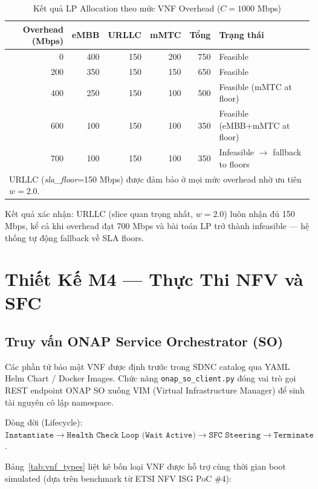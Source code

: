 \documentclass[12pt,a4paper]{article}
\begin{document}
\begin{table}[H]
\centering
\caption{Kết quả LP Allocation theo mức VNF Overhead ($C=1000$ Mbps)}
\label{tab:lp_overhead}
\begin{tabular}{rrrrrl}
\toprule
\textbf{Overhead (Mbps)} & \textbf{eMBB} & \textbf{URLLC} & \textbf{mMTC} & \textbf{Tổng} & \textbf{Trạng thái} \\
\midrule
0   & 400 & 150 & 200 & 750  & Feasible \\
200 & 350 & 150 & 150 & 650  & Feasible \\
400 & 250 & 150 & 100 & 500  & Feasible (mMTC at floor) \\
600 & 100 & 150 & 100 & 350  & Feasible (eMBB+mMTC at floor) \\
700 & 100 & 150 & 100 & 350  & Infeasible $\rightarrow$ fallback to floors \\
\bottomrule
\multicolumn{6}{l}{\footnotesize URLLC (\textit{sla\_floor}=150 Mbps) được đảm bảo ở mọi mức overhead nhờ ưu tiên $w=2.0$.}
\end{tabular}
\end{table}

Kết quả xác nhận: URLLC (slice quan trọng nhất, $w=2.0$) luôn nhận đủ 150 Mbps, kể cả khi overhead đạt 700 Mbps và bài toán LP trở thành infeasible — hệ thống tự động fallback về SLA floors.

\section{Thiết Kế M4 --- Thực Thi NFV và SFC}

\subsection{Truy vấn ONAP Service Orchestrator (SO)}

Các phần tử bảo mật VNF được định trước trong SDNC catalog qua YAML Helm Chart / Docker Images. Chức năng \texttt{onap\_so\_client.py} đóng vai trò gọi REST endpoint ONAP SO xuống VIM (Virtual Infrastructure Manager) để sinh tài nguyên cô lập namespace.

Dòng đời (Lifecycle): $\texttt{Instantiate} \rightarrow \texttt{Health Check Loop (Wait Active)} \rightarrow \texttt{SFC Steering} \rightarrow \texttt{Terminate}$.

Bảng~\ref{tab:vnf_types} liệt kê bốn loại VNF được hỗ trợ cùng thời gian boot simulated (dựa trên benchmark từ ETSI NFV ISG PoC \#4):
\end{document}
